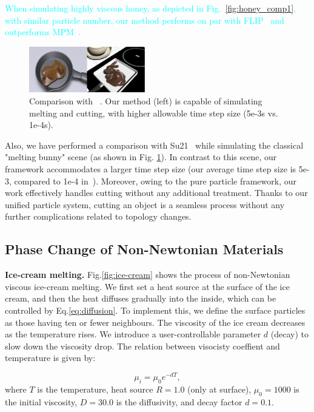 \documentclass[10pt,journal,compsoc]{IEEEtran}
\newcommand{\revised}[1]{{\textcolor{cyan}{#1}}}
\begin{document}
\revised{When simulating highly viscous honey, as depicted in Fig.~\ref{fig:honey_comp1}, with similar particle number, our method performs on par with FLIP~\cite{Shao-Huang2022-unsmoothed} and outperforms MPM~\cite{Fang2019-sillyRubber}.}

\begin{figure}[htbp]
	\centering
	\includegraphics[width=0.45\textwidth]{pics/comp-melting-bunny.pdf}
	\caption{Comparison with ~\cite{Su2021}. Our method (left) is capable of simulating melting and cutting, with higher allowable time step size (5e-3s vs. 1e-4s). }     \label{fig:comp-melting-bunny1}
\end{figure}


Also, we have performed a comparison with Su21~\cite{Su2021} while simulating the classical "melting bunny" scene (as shown in Fig. \ref{fig:comp-melting-bunny1}). In contrast to this scene, our framework accommodates a larger time step size (our average time step size is 5e-3, compared to 1e-4 in~\cite{Su2021}). Moreover, owing to the pure particle framework, our work effectively handles cutting without any additional treatment.  Thanks to our unified particle system, cutting an object is a seamless process without any further complications related to topology changes.

\subsection{Phase Change of Non-Newtonian Materials}

\textbf{Ice-cream melting.}
Fig.\ref{fig:ice-cream} shows the process of non-Newtonian viscous ice-cream melting. We first set a heat source at the surface of the ice cream, and then the heat diffuses gradually into the inside, which can be controlled by Eq.\ref{eq:diffusion}. To implement this, we define the surface particles as those having ten or fewer neighbours. The viscosity of the ice cream decreases as the temperature rises. We introduce a user-controllable parameter $d$ (decay) to slow down the viscosity drop. The relation between visocisty coeffient and temperature is given by:

\begin{equation}
	\mu_i = \mu_0 e^{-d T},
\end{equation}
where $T$ is the temperature, heat source $R = 1.0$ (only at surface), $\mu_0 = 1000$ is the initial viscosity, $D = 30.0$ is the diffusivity, and decay factor $d= 0.1$.
\end{document}

